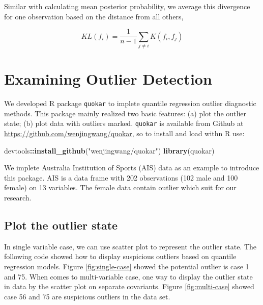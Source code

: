 \documentclass[11pt,a4paper,]{article}
\newenvironment{Shaded}{\begin{snugshade}}{\end{snugshade}}
\newcommand{\KeywordTok}[1]{\textcolor[rgb]{0.13,0.29,0.53}{\textbf{#1}}}
\newcommand{\StringTok}[1]{\textcolor[rgb]{0.31,0.60,0.02}{#1}}
\newcommand{\OperatorTok}[1]{\textcolor[rgb]{0.81,0.36,0.00}{\textbf{#1}}}
\newcommand{\NormalTok}[1]{#1}
\theoremstyle{definition}
\theoremstyle{definition}
\theoremstyle{remark}
\begin{document}
Similar with calculating mean posterior probability, we average this
divergence for one observation based on the distance from all others,

\begin{equation}
KL(f_i)=\frac{1}{n-1}\sum_{j\neq i}K(f_i, f_j)
\label{eq:mean_posterior_kl}
\end{equation}

\section{Examining Outlier Detection}\label{examining-outlier-detection}

We developed R package \texttt{quokar} to implete quantile regression
outlier diagnostic methods. This package mainly realized two basic
features: (a) plot the outlier state; (b) plot data with outliers
marked. \texttt{quokar} is available from Github at
\url{https://github.com/wenjingwang/quokar}, so to install and load
withn R use:

\begin{Shaded}
\begin{Highlighting}[]
\NormalTok{devtools}\OperatorTok{::}\KeywordTok{install_github}\NormalTok{(}\StringTok{"wenjingwang/quokar"}\NormalTok{)}
\KeywordTok{library}\NormalTok{(quokar)}
\end{Highlighting}
\end{Shaded}

We implete Australia Institution of Sports (AIS) data as an example to
introduce this package. AIS is a data frame with 202 observations (102
male and 100 female) on 13 variables. The female data contain outlier
which suit for our research.

\subsection{Plot the outlier state}\label{plot-the-outlier-state}

In single variable case, we can use scatter plot to represent the
outlier state. The following code showed how to display suspicious
outliers based on quantile regression models. Figure
\ref{fig:single-case} showed the potential outlier is case 1 and 75.
When comes to multi-variable case, one way to display the outlier state
in data by the scatter plot on separate covariants. Figure
\ref{fig:multi-case} showed case 56 and 75 are suspicious outliers in
the data set.
\end{document}
